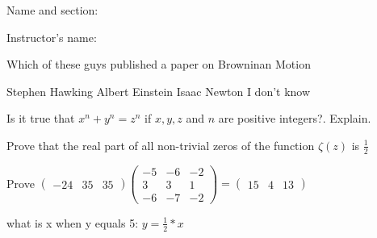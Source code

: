 \documentclass{exam}
\begin{document}
 
\begin{center}
\end{center}
\vspace{5mm}

Name and section:\enspace\hrulefill
 
\vspace{5mm}
 
Instructor’s name:\enspace\hrulefill

\addpoints
 
\begin{questions}
\question[20] Which of these guys published a paper on Browninan Motion

\begin{checkboxes}
 \choice Stephen Hawking 
 \choice Albert Einstein
 \choice Isaac Newton
 \choice I don't know
\end{checkboxes}

\question[10] Is it true that \(x^n + y^n = z^n\) if \(x,y,z\) and \(n\) are
positive integers?. Explain.

 
\question[10] Prove that the real part of all non-trivial zeros of the function
\(\zeta(z)\) is \(\frac{1}{2}\)


\question[10] Prove $\begin{pmatrix} -24 & 35 & 35 \end{pmatrix}\begin{pmatrix}-5&-6&-2\\3&3&1\\-6&-7&-2\end{pmatrix} = \begin{pmatrix}15 & 4 & 13 \end{pmatrix}$


\bonusquestion[10] what is x when y equals 5: $y = \frac{1}{2} * x$



\end{questions}

\begin{center}
\combinedgradetable[h][questions]
\end{center}
\end{document}
